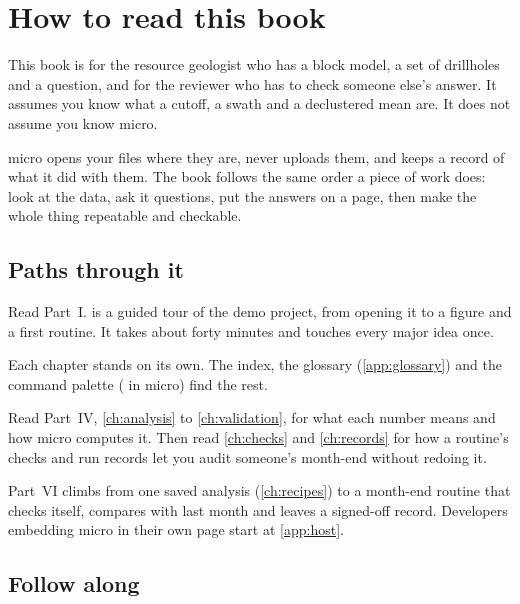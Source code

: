 \chapter*{How to read this book}

This book is for the resource geologist who has a block model, a set of drillholes and a question,
and for the reviewer who has to check someone else's answer. It assumes you know what a cutoff, a
swath and a declustered mean are. It does not assume you know micro.

micro opens your files where they are, never uploads them, and keeps a record of what it did with
them. The book follows the same order a piece of work does: look at the data, ask it questions,
put the answers on a page, then make the whole thing repeatable and checkable.

\section*{Paths through it}

\begin{description}[leftmargin=0pt, labelsep=0.6em, font=\sffamily\bfseries\color{ink}]
\item[New to micro.] Read Part~I.  is a guided tour of the demo project, from opening
  it to a figure and a first routine. It takes about forty minutes and touches every major idea once.
\item[Here for one task.] Each chapter stands on its own. The index, the glossary
  (\cref{app:glossary}) and the command palette ( in micro) find the rest.
\item[Reviewing an estimate.] Read Part~IV, \cref{ch:analysis} to \cref{ch:validation}, for what
  each number means and how micro computes it. Then read \cref{ch:checks} and \cref{ch:records} for
  how a routine's checks and run records let you audit someone's month-end without redoing it.
\item[Automating.] Part~VI climbs from one saved analysis (\cref{ch:recipes}) to a month-end
  routine that checks itself, compares with last month and leaves a signed-off record. Developers
  embedding micro in their own page start at \cref{app:host}.
\end{description}

\section*{Follow along}

